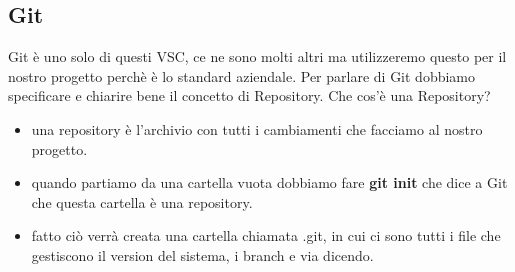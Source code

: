 \documentclass[a4paper,12pt]{article}
\begin{document}
\subsection{Git}
Git è uno solo di questi VSC, ce ne sono molti altri ma utilizzeremo questo per il nostro progetto perchè è lo standard aziendale.
Per parlare di Git dobbiamo specificare e chiarire bene il concetto di Repository.
Che cos'è una Repository? 
\begin{itemize}
    \item una repository è l'archivio con tutti i cambiamenti che facciamo al nostro progetto.
    \item quando partiamo da una cartella vuota dobbiamo fare \textbf{git init} che dice a Git che questa cartella è una repository. 
    \item fatto ciò verrà creata una cartella chiamata .git, in cui ci sono tutti i file che gestiscono il version del sistema, i branch e via dicendo.
\end{itemize}
\end{document}
